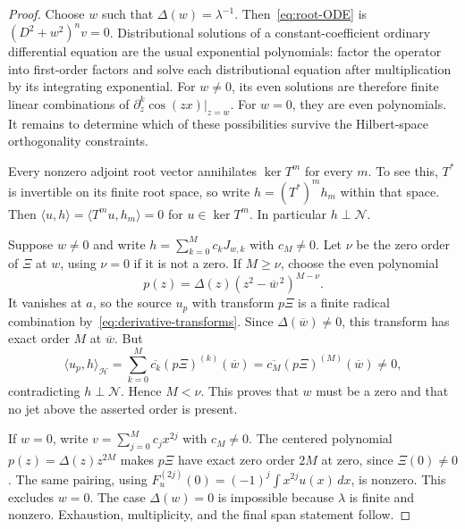 \documentclass[11pt,a4paper]{article}
\numberwithin{equation}{section}
\theoremstyle{definition}
\theoremstyle{remark}
\newcommand{\Hh}{\mathcal H}
\newcommand{\Nn}{\mathcal N}
\newcommand{\ip}[2]{\langle #1,#2\rangle}
\begin{document}
\begin{proof}
Choose $w$ such that $\Delta(w)=\lambda^{-1}$. Then~\eqref{eq:root-ODE} is $(D^2+w^2)^nv=0$. Distributional solutions of a constant-coefficient ordinary differential equation are the usual exponential polynomials: factor the operator into first-order factors and solve each distributional equation after multiplication by its integrating exponential. For $w\ne0$, its even solutions are therefore finite linear combinations of $\partial_z^k\cos(zx)|_{z=w}$. For $w=0$, they are even polynomials. It remains to determine which of these possibilities survive the Hilbert-space orthogonality constraints.

Every nonzero adjoint root vector annihilates $\ker T^m$ for every $m$. To see this, $T^*$ is invertible on its finite root space, so write $h=(T^*)^mh_m$ within that space. Then $\ip{u}{h}=\ip{T^mu}{h_m}=0$ for $u\in\ker T^m$. In particular $h\perp\Nn$.

Suppose $w\ne0$ and write $h=\sum_{k=0}^M c_kJ_{w,k}$ with $c_M\ne0$. Let $\nu$ be the zero order of $\Xi$ at $w$, using $\nu=0$ if it is not a zero. If $M\ge\nu$, choose the even polynomial
\[
 p(z)=\Delta(z)(z^2-\overline{w}^{\,2})^{M-\nu}.
\]
It vanishes at $a$, so the source $u_p$ with transform $p\Xi$ is a finite radical combination by~\eqref{eq:derivative-transforms}. Since $\Delta(\overline w)\ne0$, this transform has exact order $M$ at $\overline w$. But
\[
 \ip{u_p}{h}_{\Hh}
 =\sum_{k=0}^M\overline{c_k}(p\Xi)^{(k)}(\overline w)
 =\overline{c_M}(p\Xi)^{(M)}(\overline w)\ne0,
\]
contradicting $h\perp\Nn$. Hence $M<\nu$. This proves that $w$ must be a zero and that no jet above the asserted order is present.

If $w=0$, write $v=\sum_{j=0}^M c_jx^{2j}$ with $c_M\ne0$. The centered polynomial $p(z)=\Delta(z)z^{2M}$ makes $p\Xi$ have exact zero order $2M$ at zero, since $\Xi(0)\ne0$. The same pairing, using $F_u^{(2j)}(0)=(-1)^j\int x^{2j}u(x)\,dx$, is nonzero. This excludes $w=0$. The case $\Delta(w)=0$ is impossible because $\lambda$ is finite and nonzero. Exhaustion, multiplicity, and the final span statement follow.
\end{proof}
\end{document}
